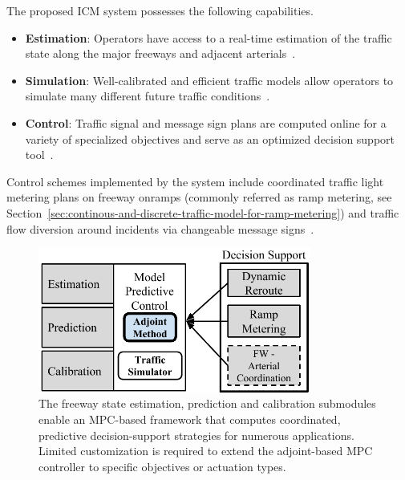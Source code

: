 The proposed ICM system possesses the following capabilities.

\begin{itemize}
	\item \textbf{Estimation}: Operators have access to a real-time estimation of the traffic state along the major freeways and adjacent arterials~\cite{work2010traffic,Jacqueta}.
	\item \textbf{Simulation}: Well-calibrated and efficient traffic models allow operators to simulate many different future traffic conditions~\cite{Muralidharan2009b,dervisoglu2014macroscopic,Hunter}.
	\item \textbf{Control}: Traffic signal and message sign plans are computed online for a variety of specialized objectives and serve as an optimized decision support tool~\cite{Reilly2013b,Reilly2014b}.
\end{itemize}

Control schemes implemented by the system include coordinated traffic light metering plans on freeway onramps (commonly referred as ramp metering, see Section~\ref{sec:continous-and-discrete-traffic-model-for-ramp-metering}) and traffic flow diversion around incidents via changeable message signs~\cite{Samaranayake2014}. 

\begin{figure}[htbp]
	\centering
	\includegraphics[width=0.8\textwidth]{diagrams/f2}
	\caption[\emph{Connected Corridors} control system architecture.]{The freeway state estimation, prediction and calibration submodules enable an MPC-based framework that computes coordinated, predictive decision-support strategies for numerous applications. Limited customization is required to extend the adjoint-based MPC controller to specific objectives or actuation types.}
	\label{fig:decision-support}
\end{figure}

